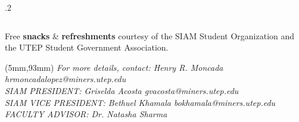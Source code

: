 \documentclass[10pt]{beamer}
\newenvironment{reference}[2]{                            %
  \begin{textblock*}{\textwidth}(#1,#2)                   %
      \footnotesize\it\bgroup\color{white}}{\egroup       %
  \end{textblock*}}                                       %
\begin{document}
\begin{frame}
\begin{columns}[t]
\begin{column}{.2\textwidth}
\begin{figure}[t!]
		\end{figure}
	\end{column}
\end{columns}
\begin{scriptsize}Free \textbf{snacks} \& \textbf{refreshments} courtesy of the SIAM Student Organization and the UTEP Student Government Association.\end{scriptsize}
  \begin{reference}{5mm}{93mm}                           					%
  For more details, contact: Henry R. Moncada \hspace*{1.5cm} hrmoncadalopez@miners.utep.edu\\  %
  SIAM PRESIDENT: Griselda Acosta             \hspace*{1.5cm} gvacosta@miners.utep.edu\\
  SIAM VICE PRESIDENT: Bethuel Khamala        \hspace*{1.5cm} bokhamala@miners.utep.edu\\   
  FACULTY ADVISOR: Dr. Natasha Sharma\\
  \end{reference}                                         							
\end{frame}
\end{document}
